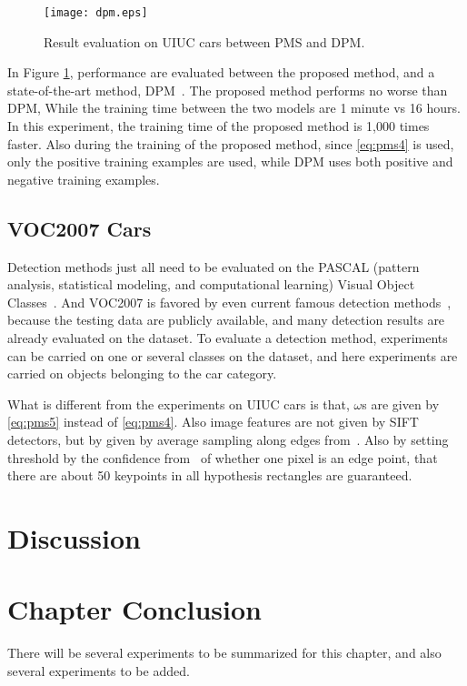 \begin{figure}[H]
\centering

\texttt{[image: dpm.eps]}


\caption[Result comparison with deformable part model~\citep{ac31}]{Result evaluation on UIUC cars between PMS and DPM.}
\label{fig:c56}
\end{figure}

In Figure \ref{fig:c56}, performance are evaluated between the proposed method, and a state-of-the-art method, DPM~\citep{ac31}. The proposed method performs no worse than DPM,
While the training time between the two models are 1 minute vs 16 hours. In this experiment, the training time of the proposed method is 1,000 times faster. Also during the training of the proposed method, since \ref{eq:pms4} is used, only the positive training examples are used, while DPM uses both positive and negative training examples.
\subsection{VOC2007 Cars}

Detection methods just all need to be evaluated on the PASCAL (pattern analysis, statistical modeling, and computational learning) Visual Object Classes~\citep{voc}. And VOC2007 is favored by even current famous detection methods~\citep{408}, because the testing data are publicly available, and many detection results are already evaluated on the dataset. To evaluate a detection method, experiments can be carried on one or several classes on the dataset, and here experiments are carried on objects belonging to the car category.

What is different from the experiments on UIUC cars is that, $\omega$s are given by \ref{eq:pms5} instead of \ref{eq:pms4}. Also image features are not given by SIFT detectors, but by given by average sampling along edges from~\citep{bdt}. Also by setting threshold by the confidence from~\citep{bdt} of whether one  pixel is an edge point, that there are about 50 keypoints in all hypothesis rectangles are guaranteed.



\section{Discussion}
\label{dis5}

\section{Chapter Conclusion}
\label{conc5}

There will be several experiments to be summarized for this chapter, and also several experiments to be added.
